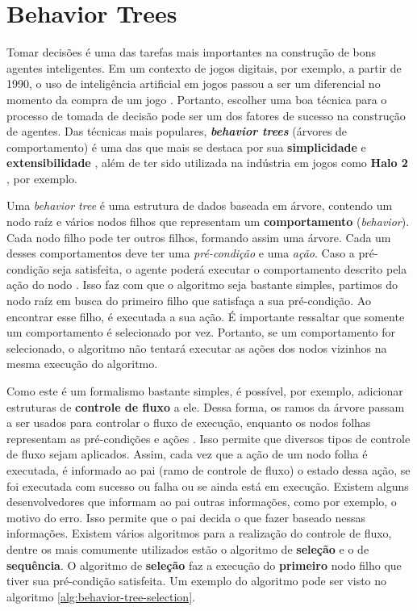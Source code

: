 \chapter{\label{chap:behavior-trees}Behavior Trees}

Tomar decisões é uma das tarefas mais importantes na construção de bons
agentes inteligentes. Em um contexto de jogos digitais, por exemplo, a
partir de 1990, o uso de inteligência artificial em jogos passou a ser um
diferencial no momento da compra de um jogo \cite[Cap
1.]{Millington:2009:AIG:1795711}. Portanto, escolher uma boa técnica para
o processo de tomada de decisão pode ser um dos fatores de sucesso na
construção de agentes. Das técnicas mais populares,
\textit{\textbf{behavior trees}} (árvores de comportamento) é uma das que
mais se destaca por sua \textbf{simplicidade} e \textbf{extensibilidade}
\cite[Cap. 4]{Rabin:2013:GAP:2566761}, além de ter sido utilizada na
indústria em jogos como \textbf{Halo 2} \cite[Cap.
5]{Millington:2009:AIG:1795711}, por exemplo.

Uma \textit{behavior tree} é uma estrutura de dados baseada em árvore,
contendo um nodo raíz e vários nodos filhos que representam um
\textbf{comportamento} (\textit{behavior}). Cada nodo filho pode ter
outros filhos, formando assim uma árvore. Cada um desses comportamentos
deve ter uma \textit{pré-condição} e uma \textit{ação}. Caso a
pré-condição seja satisfeita, o agente poderá executar o comportamento
descrito pela ação do nodo \cite[Cap 4.]{Rabin:2013:GAP:2566761}. Isso faz
com que o algoritmo seja bastante simples, partimos do nodo raíz em busca
do primeiro filho que satisfaça a sua pré-condição. Ao encontrar esse
filho, é executada a sua ação. É importante ressaltar que
somente um comportamento é selecionado por vez. Portanto, se um
comportamento for selecionado, o algoritmo não tentará executar as ações
dos nodos vizinhos na mesma execução do algoritmo.

Como este é um formalismo bastante simples, é possível, por exemplo, adicionar
estruturas de \textbf{controle de fluxo} a ele. Dessa forma, os ramos da
árvore passam a ser usados para controlar o fluxo de execução, enquanto os
nodos folhas representam as pré-condições e ações \cite[Cap.
10]{Rabin:2015:GAP:2821138}. Isso permite que diversos tipos de controle
de fluxo sejam aplicados. Assim, cada vez que a ação de um nodo folha é
executada, é informado ao pai (ramo de controle de fluxo) o estado dessa
ação, se foi executada com sucesso ou falha ou se ainda está em execução.
Existem alguns desenvolvedores que informam ao pai outras informações,
como por exemplo, o motivo do erro. Isso permite que o pai decida o que
fazer baseado nessas informações. Existem vários algoritmos para a
realização do controle de fluxo, dentre os mais comumente utilizados estão
o algoritmo de \textbf{seleção} e o de \textbf{sequência}. O algoritmo de
\textbf{seleção} faz a execução do \textbf{primeiro} nodo filho que tiver sua
pré-condição satisfeita. Um exemplo do algoritmo pode ser visto no algoritmo \ref{alg:behavior-tree-selection}.

